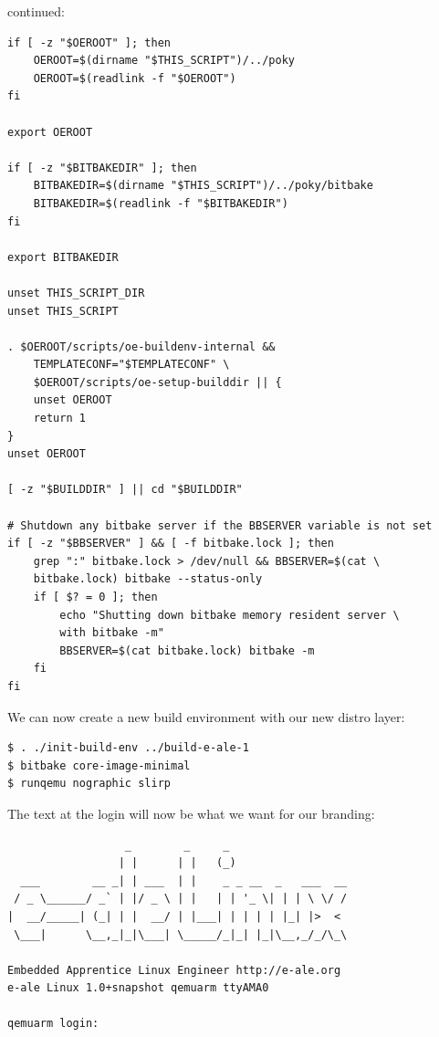 \documentclass[a4paper,12pt,obeyspaces,spaces,hyphens]{article}
\begin{document}
continued:
\begin{tcolorbox}[enhanced jigsaw,colback=bg,boxrule=0pt,arc=0pt]
\begin{verbatim}
if [ -z "$OEROOT" ]; then
    OEROOT=$(dirname "$THIS_SCRIPT")/../poky
    OEROOT=$(readlink -f "$OEROOT")
fi

export OEROOT

if [ -z "$BITBAKEDIR" ]; then
    BITBAKEDIR=$(dirname "$THIS_SCRIPT")/../poky/bitbake
    BITBAKEDIR=$(readlink -f "$BITBAKEDIR")
fi

export BITBAKEDIR

unset THIS_SCRIPT_DIR
unset THIS_SCRIPT

. $OEROOT/scripts/oe-buildenv-internal &&
    TEMPLATECONF="$TEMPLATECONF" \
    $OEROOT/scripts/oe-setup-builddir || {
    unset OEROOT
    return 1
}
unset OEROOT

[ -z "$BUILDDIR" ] || cd "$BUILDDIR"

# Shutdown any bitbake server if the BBSERVER variable is not set
if [ -z "$BBSERVER" ] && [ -f bitbake.lock ]; then
    grep ":" bitbake.lock > /dev/null && BBSERVER=$(cat \
    bitbake.lock) bitbake --status-only
    if [ $? = 0 ]; then
        echo "Shutting down bitbake memory resident server \
        with bitbake -m"
        BBSERVER=$(cat bitbake.lock) bitbake -m
    fi
fi
\end{verbatim}
\end{tcolorbox}

We can now create a new build environment with our new distro layer:

\begin{verbatim}
$ . ./init-build-env ../build-e-ale-1
$ bitbake core-image-minimal
$ runqemu nographic slirp
\end{verbatim}

The text at the login will now be what we want for our branding:
\begin{tcolorbox}[enhanced jigsaw,colback=bg,boxrule=0pt,arc=0pt]
\begin{verbatim}
                  _        _     _
                 | |      | |   (_)
  ___        __ _| | ___  | |    _ _ __  _   ___  __
 / _ \______/ _` | |/ _ \ | |   | | '_ \| | | \ \/ /
|  __/_____| (_| | |  __/ | |___| | | | | |_| |>  <
 \___|      \__,_|_|\___| \_____/_|_| |_|\__,_/_/\_\

Embedded Apprentice Linux Engineer http://e-ale.org
e-ale Linux 1.0+snapshot qemuarm ttyAMA0

qemuarm login:
\end{verbatim}
\end{tcolorbox}
\end{document}
